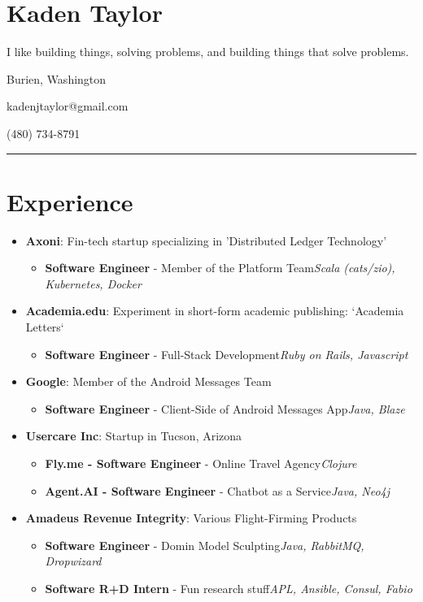 \documentclass{article}
\begin{document}
\section*{Kaden Taylor}
I like building things, solving problems, and building things that solve problems.
\newline

Burien, Washington

kadenjtaylor@gmail.com

(480) 734-8791

\noindent\rule{\linewidth}{1pt}

\section*{Experience}

\begin{itemize}\item \textbf{Axoni}: Fin-tech startup specializing in 'Distributed Ledger Technology' \begin{itemize}\item \textbf{Software Engineer} - Member of the Platform Team\newline \textit{Scala (cats/zio), Kubernetes, Docker}\end{itemize}
\item \textbf{Academia.edu}: Experiment in short-form academic publishing: `Academia Letters` \begin{itemize}\item \textbf{Software Engineer} - Full-Stack Development\newline \textit{Ruby on Rails, Javascript}\end{itemize}
\item \textbf{Google}: Member of the Android Messages Team \begin{itemize}\item \textbf{Software Engineer} - Client-Side of Android Messages App\newline \textit{Java, Blaze}\end{itemize}
\item \textbf{Usercare Inc}: Startup in Tucson, Arizona \begin{itemize}\item \textbf{Fly.me - Software Engineer} - Online Travel Agency\newline \textit{Clojure}
\item \textbf{Agent.AI - Software Engineer} - Chatbot as a Service\newline \textit{Java, Neo4j}\end{itemize}
\item \textbf{Amadeus Revenue Integrity}: Various Flight-Firming Products \begin{itemize}\item \textbf{Software Engineer} - Domin Model Sculpting\newline \textit{Java, RabbitMQ, Dropwizard}
\item \textbf{Software R+D Intern} - Fun research stuff\newline \textit{APL, Ansible, Consul, Fabio}\end{itemize}\end{itemize}
\end{document}
